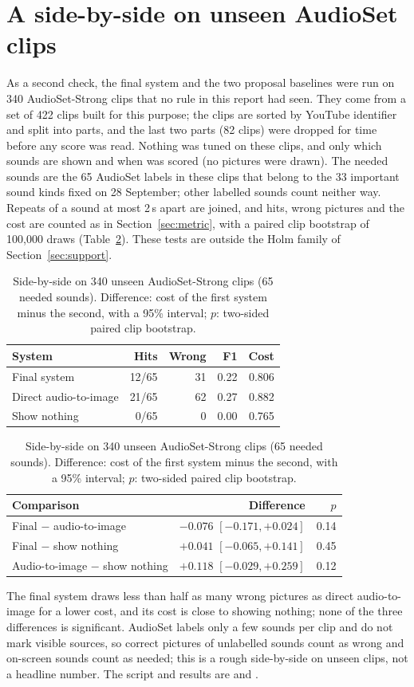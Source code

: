 \section{A side-by-side on unseen AudioSet clips}\label{app:fresh}

As a second check, the final system and the two proposal baselines were run on 340 AudioSet-Strong clips that no rule
in this report had seen. They come from a set of 422 clips built for this purpose; the clips are sorted by YouTube
identifier and split into parts, and the last two parts (82 clips) were dropped for time before any score was read.
Nothing was tuned on these clips, and only which sounds are shown and when was scored (no pictures were drawn). The
needed sounds are the 65 AudioSet labels in these clips that belong to the 33 important sound kinds fixed on 28 September;
other labelled sounds count neither way. Repeats of a sound at most 2\,s apart are joined, and hits, wrong pictures and
the cost are counted as in Section~\ref{sec:metric}, with a paired clip bootstrap of 100{,}000 draws
(Table~\ref{tab:fresh}). These tests are outside the Holm family of Section~\ref{sec:support}.

\begin{table}[htbp]
\centering\small
\caption{Side-by-side on 340 unseen AudioSet-Strong clips (65 needed sounds). Difference: cost of the first system
minus the second, with a 95\% interval; $p$: two-sided paired clip bootstrap.}\label{tab:fresh}
\begin{tabular}{lrrrr}
\toprule
System & Hits & Wrong & F1 & Cost \\
\midrule
Final system & 12/65 & 31 & 0.22 & 0.806 \\
Direct audio-to-image & 21/65 & 62 & 0.27 & 0.882 \\
Show nothing & 0/65 & 0 & 0.00 & 0.765 \\
\bottomrule
\end{tabular}

\medskip
\begin{tabular}{lrr}
\toprule
Comparison & Difference & $p$ \\
\midrule
Final $-$ audio-to-image & $-0.076$ $[-0.171, +0.024]$ & 0.14 \\
Final $-$ show nothing & $+0.041$ $[-0.065, +0.141]$ & 0.45 \\
Audio-to-image $-$ show nothing & $+0.118$ $[-0.029, +0.259]$ & 0.12 \\
\bottomrule
\end{tabular}
\end{table}

The final system draws less than half as many wrong pictures as direct audio-to-image for a lower cost, and its cost
is close to showing nothing; none of the three differences is significant. AudioSet labels only a few sounds per clip
and do not mark visible sources, so correct pictures of unlabelled sounds count as wrong and on-screen sounds count as
needed; this is a rough side-by-side on unseen clips, not a headline number. The script and results are
 and .
